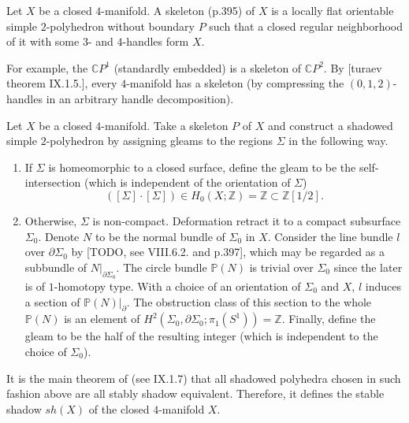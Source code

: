 \begin{definition}\label{def/skeleton-of-a-4-manifold}
  Let $X$ be a closed $4$-manifold. A skeleton (p.395) of $X$ is
  a locally flat orientable simple $2$-polyhedron without
  boundary $P$ such that a closed regular neighborhood of it with
  some $3$- and $4$-handles form $X$.
\end{definition}

\noindent For example, the $\mathbb{C}P^{1}$ (standardly
embedded) is a skeleton of $\mathbb{C}P^{2}$. By [turaev theorem
IX.1.5.], every $4$-manifold has a skeleton (by compressing the
$(0,1,2)$-handles in an arbitrary handle decomposition).

\begin{definition}\label{def/stable-shadow-of-a-4-manifold}
  Let $X$ be a closed $4$-manifold. Take a skeleton $P$ of $X$
  and construct a shadowed simple $2$-polyhedron by assigning
  gleams to the regions $\Sigma$ in the following way.
  \begin{enumerate}
    \item If $\Sigma$ is homeomorphic to a closed surface, define
          the gleam to be the self-intersection (which is
          independent of the orientation of $\Sigma$)
          $$([\Sigma] \cdot [\Sigma]) \in H_{0}(X;\mathbb{Z}) = \mathbb{Z} \subset \mathbb{Z}\left[1/2\right].$$
    \item Otherwise, $\Sigma$ is non-compact. Deformation retract
          it to a compact subsurface $\Sigma_{0}$. Denote $N$ to
          be the normal bundle of $\Sigma_{0}$ in $X$. Consider
          the line bundle $l$ over $\partial \Sigma_{0}$ by
          [TODO, see VIII.6.2. and p.397], which may be regarded
          as a subbundle of $N|_{\partial \Sigma_{0}}$. The
          circle bundle $\mathbb{P}(N)$ is trivial over
          $\Sigma_{0}$ since the later is of $1$-homotopy type.
          With a choice of an orientation of $\Sigma_{0}$ and
          $X$, $l$ induces a section of
          $\mathbb{P}(N)|_{\partial}$. The obstruction class of
          this section to the whole $\mathbb{P}(N)$ is an element
          of
          $H^{2}(\Sigma_{0}, \partial \Sigma_{0}; \pi_{1}(S^{1})) = \mathbb{Z}$.
          Finally, define the gleam to be the half of the
          resulting integer (which is independent to the choice
          of $\Sigma_{0}$).
  \end{enumerate}
  It is the main theorem of \cite[chapter IX]{turaev} (see
  IX.1.7) that all shadowed polyhedra chosen in such fashion
  above are all stably shadow equivalent. Therefore, it defines
  the stable shadow $sh(X)$ of the closed $4$-manifold $X$.
\end{definition}

